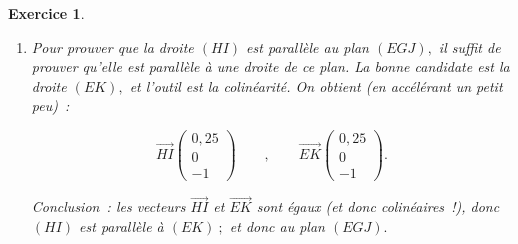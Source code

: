 \documentclass[10pt]{article}
\newtheorem{exo}{Exercice}
\begin{document}
\begin{exo}
\begin{multicols}{2}
\begin{enumerate}
   est un tableau de proportionnalité. On a donc \[1\times (-0,75)=1\times (x-1).\] On développe et on résout~:
   \[-0,75=x-1\iff x=-0,75+1=0,25.\]
   
   Conclusion~: $K(0,25~;0;0).$


\item Pour prouver que la droite $(HI)$ est parallèle au plan $(EGJ),$ il suffit de prouver qu'elle est parallèle à une droite de ce plan. La bonne candidate est la droite $(EK),$ et l'outil est la colinéarité. On obtient (en accélérant un petit peu)~:

\[\overrightarrow{HI}\begin{pmatrix} 0,25
\\0\\-1 \end{pmatrix}\qquad,\qquad \overrightarrow{EK}\begin{pmatrix} 0,25
\\0\\-1 \end{pmatrix}.\]

Conclusion~: les vecteurs $\overrightarrow{HI}$ et $\overrightarrow{EK}$ sont égaux (et donc colinéaires~!), donc $(HI)$ est parallèle à $(EK)~;$ et donc au plan $(EGJ).$


\end{enumerate}

\end{multicols}
\end{exo}
\end{document}
